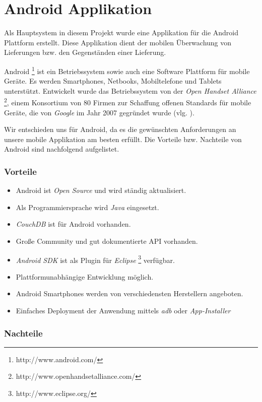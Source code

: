 \section{Android Applikation}
\label{sec:android}

Als Hauptsystem in diesem Projekt wurde eine Applikation für die Android
	Plattform erstellt. Diese Applikation dient der mobilen Überwachung
	von Lieferungen bzw. den Gegenständen einer Lieferung.

Android \footnote{http://www.android.com/} ist ein Betriebssystem sowie auch eine Software Plattform für mobile Geräte.
Es werden Smartphones, Netbooks, Mobiltelefone und Tablets unterstützt. Entwickelt wurde das Betriebssystem von der
\emph{Open Handset Alliance} \footnote{http://www.openhandsetalliance.com/}, einem Konsortium von 80 Firmen zur Schaffung offenen Standards 
für mobile Geräte, die von \emph{Google} im Jahr 2007 gegründet wurde (vlg. \cite{OHA07}). 

Wir entschieden uns für Android, da es die gewünschten Anforderungen an unsere mobile Applikation am besten erfüllt. Die Vorteile bzw. Nachteile 
von Android sind nachfolgend aufgelistet.

\subsubsection*{Vorteile}

\begin{itemize}
 \item Android ist \emph{Open Source} und wird ständig aktualisiert.
 \item Als Programmiersprache wird \emph{Java} eingesetzt.
 \item \emph{CouchDB} ist für Android vorhanden.
 \item Große Community und gut dokumentierte API vorhanden.
 \item \emph{Android SDK} ist als Plugin für \emph{Eclipse} \footnote{http://www.eclipse.org/} verfügbar.
 \item Plattformunabhängige Entwicklung möglich.
 \item Android Smartphones werden von verschiedensten Herstellern angeboten.
 \item Einfaches Deployment der Anwendung mittels \emph{adb} oder \emph{App-Installer}
\end{itemize}

\subsubsection*{Nachteile}

